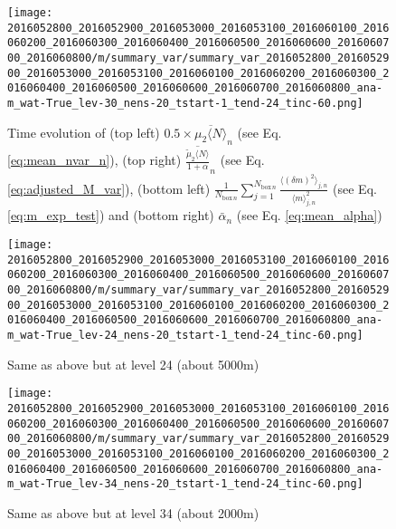 \documentclass[a4paper, 12pt]{article}
\begin{document}
\begin{figure}[ht] \label{fig:comp_summary_var}
\noindent \centering
\texttt{[image: 2016052800\_2016052900\_2016053000\_2016053100\_2016060100\_2016060200\_2016060300\_2016060400\_2016060500\_2016060600\_2016060700\_2016060800/m/summary\_var/summary\_var\_2016052800\_2016052900\_2016053000\_2016053100\_2016060100\_2016060200\_2016060300\_2016060400\_2016060500\_2016060600\_2016060700\_2016060800\_ana-m\_wat-True\_lev-30\_nens-20\_tstart-1\_tend-24\_tinc-60.png]}\\
\caption{Time evolution of (top left) $0.5 \times \overline{\mu_{2}\langle N \rangle}_n$ (see Eq. \ref{eq:mean_nvar_n}), (top right) $\overline{\frac{\tilde{\mu}_2 \langle N \rangle}{1+\alpha}}_n$ (see Eq. \ref{eq:adjusted_M_var}), (bottom left) $\frac{1}{N_{\mathrm{box}\,n}} \sum_{j=1}^{N_{\mathrm{box}\,n}} \frac{\langle (\delta m)^2 \rangle_{j,n}}{\langle m \rangle_{j,n}^2}$ (see Eq. \ref{eq:m_exp_test}) and (bottom right) $\bar{\alpha}_n$ (see Eq. \ref{eq:mean_alpha})}
\end{figure}
\begin{figure}[ht]
\noindent \centering
\texttt{[image: 2016052800\_2016052900\_2016053000\_2016053100\_2016060100\_2016060200\_2016060300\_2016060400\_2016060500\_2016060600\_2016060700\_2016060800/m/summary\_var/summary\_var\_2016052800\_2016052900\_2016053000\_2016053100\_2016060100\_2016060200\_2016060300\_2016060400\_2016060500\_2016060600\_2016060700\_2016060800\_ana-m\_wat-True\_lev-24\_nens-20\_tstart-1\_tend-24\_tinc-60.png]}\\
\caption{Same as above but at level 24 (about 5000m)}
\end{figure}
\begin{figure}[ht]
\noindent \centering
\texttt{[image: 2016052800\_2016052900\_2016053000\_2016053100\_2016060100\_2016060200\_2016060300\_2016060400\_2016060500\_2016060600\_2016060700\_2016060800/m/summary\_var/summary\_var\_2016052800\_2016052900\_2016053000\_2016053100\_2016060100\_2016060200\_2016060300\_2016060400\_2016060500\_2016060600\_2016060700\_2016060800\_ana-m\_wat-True\_lev-34\_nens-20\_tstart-1\_tend-24\_tinc-60.png]}\\
\caption{Same as above but at level 34 (about 2000m)}
\end{figure}
\end{document}
